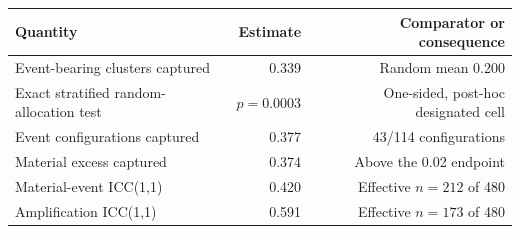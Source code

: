 \begin{tabular}{@{}lrr@{}}
\toprule
Quantity & Estimate & Comparator or consequence \\
\midrule
Event-bearing clusters captured & 0.339 & Random mean 0.200 \\
Exact stratified random-allocation test & $p=0.0003$ & One-sided, post-hoc designated cell \\
Event configurations captured & 0.377 & 43/114 configurations \\
Material excess captured & 0.374 & Above the 0.02 endpoint \\
Material-event ICC(1,1) & 0.420 & Effective $n=212$ of 480 \\
Amplification ICC(1,1) & 0.591 & Effective $n=173$ of 480 \\
\bottomrule
\end{tabular}
